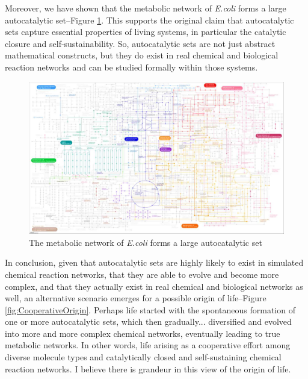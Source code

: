 \documentclass[]{article}
\begin{document}
Moreover, we have shown that the metabolic network of \emph{E.coli} forms a large autocatalytic set--Figure \ref{fig:AutoCatalyticEcoli}.
This supports the original claim
that autocatalytic sets capture
essential properties of living systems,
in particular the catalytic closure
and self-sustainability.
So, autocatalytic sets are not just
abstract mathematical constructs,
but they do exist in real chemical
and biological reaction networks
and can be studied formally
within those systems.
\begin{figure}[H]
	\caption[The metabolic network of \emph{E.coli}
	forms a large autocatalytic set.]{The metabolic network of \emph{E.coli}
		forms a large autocatalytic set\cite{sousa2015autocatalytic}}\label{fig:AutoCatalyticEcoli}
	\includegraphics[width=\textwidth]{AutoCatalyticEcoli}
\end{figure}

In conclusion, given that autocatalytic
sets are highly likely to exist
in simulated chemical reaction networks,
that they are able to evolve
and become more complex,
and that they actually exist
in real chemical and biological
networks as well,
an alternative scenario emerges
for a possible origin of life--Figure \ref{fig:CooperativeOrigin}.
Perhaps life started
with the spontaneous formation
of one or more autocatalytic sets,
which then gradually... diversified
and evolved into more and more
complex chemical networks,
eventually leading to
true metabolic networks.
In other words,
life arising as a cooperative effort
among diverse molecule types
and catalytically closed
and self-sustaining
chemical reaction networks.
I believe there is grandeur
in this view of the origin of life.
\end{document}

